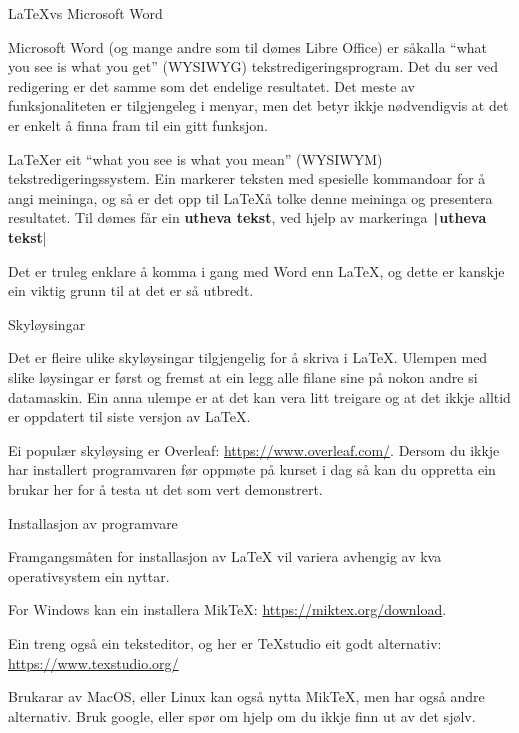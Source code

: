 \documentclass[10pt,a4paper]{beamer}
\begin{document}
	\begin{frame}{\LaTeX vs Microsoft Word}
		
		Microsoft Word (og mange andre som til dømes Libre Office) er såkalla ``what you see is what you get'' (WYSIWYG) tekstredigeringsprogram. Det du ser ved redigering er det samme som det endelige resultatet. Det meste av funksjonaliteten er tilgjengeleg i menyar, men det betyr ikkje nødvendigvis at det er enkelt å finna fram til ein gitt funksjon.
		
		\LaTeX er eit ``what you see is what you mean'' (WYSIWYM) tekstredigeringssystem. Ein markerer teksten med spesielle kommandoar for å angi meininga, og så er det opp til \LaTeX å tolke denne meininga og presentera resultatet. Til dømes får ein \textbf{utheva tekst}, ved hjelp av markeringa \texttt|\textbf{utheva tekst}|
		
		Det er truleg enklare å komma i gang med Word enn \LaTeX, og dette er kanskje ein viktig grunn til at det er så utbredt.
		
	\end{frame}
	
	\begin{frame}{Skyløysingar}
		
		Det er fleire ulike skyløysingar tilgjengelig for å skriva i \LaTeX. Ulempen med slike løysingar er først og fremst at ein legg alle filane sine på nokon andre si datamaskin. Ein anna ulempe er at det kan vera litt treigare og at det ikkje alltid er oppdatert til siste versjon av \LaTeX.
		
		Ei populær skyløysing er Overleaf: \url{https://www.overleaf.com/}. Dersom du ikkje har installert programvaren før oppmøte på kurset i dag så kan du oppretta ein brukar her for å testa ut det som vert demonstrert.
		
	\end{frame}
	
	
	\begin{frame}{Installasjon av programvare}
		
		Framgangsmåten for installasjon av \LaTeX{} vil variera avhengig av kva operativsystem ein nyttar.
		
		For Windows kan ein installera MikTeX: \url{https://miktex.org/download}.
		
		Ein treng også ein teksteditor, og her er TeXstudio eit godt alternativ: \url{https://www.texstudio.org/}
		
		Brukarar av MacOS, eller Linux kan også nytta MikTeX, men har også andre alternativ. Bruk google, eller spør om hjelp om du ikkje finn ut av det sjølv.
	\end{frame}
	
\end{document}
